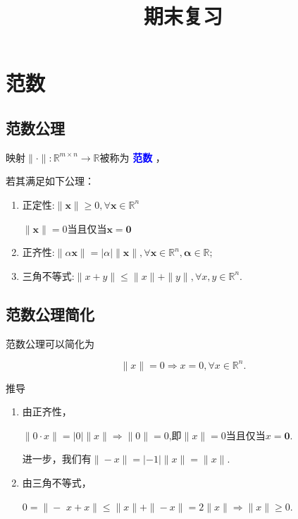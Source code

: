 \documentclass{lzureport}
\title{期末复习}
\date{\zhtoday}
\begin{document}
\makecover

%

\thispagestyle{empty}
\tableofcontents
\newpage 
\setcounter{page}{1}
\setcounter{equation}{0} %

\newpage

\section{范数}

\subsection{范数公理}

映射$\|\cdot\|:\mathbb{R}^{m\times n}\to\mathbb{R}$被称为 \textcolor{blue}{\textbf{范数}} ，

若其满足如下公理：
\begin{enumerate}[itemindent=1em,label=\arabic*)]
	\item \textcolor{YBXPurple}{正定性}:$\|\boldsymbol{x}\|\geq0,\forall\boldsymbol{x}\in \mathbb{R}^n$

	$\|\boldsymbol{x}\|=0$当且仅当$\boldsymbol{x}=\mathbf{0}$
	\item \textcolor{YBXPurple}{正齐性}:$\|\alpha\boldsymbol{x}\|=|\alpha|\|\boldsymbol{x}\|,\forall\boldsymbol{x}\in \mathbb{R}^n,\boldsymbol{\alpha}\in\mathbb{R};$ 
	\item \textcolor{YBXPurple}{三角不等式}:$\|x+y\|\leq\|x\|+\|y\|,\forall x,y\in \mathbb{R}^n.$
\end{enumerate}

\subsection{范数公理简化}
范数公理可以简化为 

$$\|x\|=0\Rightarrow x=0,\forall x\in\mathbb{R}^n.$$

\begin{derivation}{推导}
	\begin{enumerate}[itemindent=1em,label=\arabic*)]
		\item 由正齐性，
		
		$\|0\cdotp x\|=|0|\|x\|\Rightarrow\|0\|=0$,即$\|x\|=0$当且仅当$x=\mathbf{0}.$ 
		
		进一步，我们有$\|-x\|=|-1|\|x\|=\|x\|.$
	
		\item 由三角不等式，
		
		$0=\|-$ $x+x\|\leq\|x\|+\|-x\|=2\|x\|\Rightarrow\|x\|\geq0.$
	\end{enumerate}
	
\end{derivation}
\end{document}

